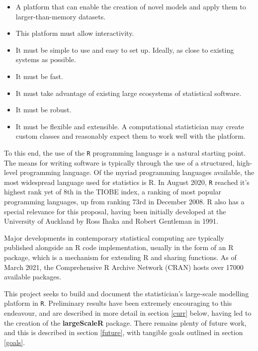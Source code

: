 \begin{itemize}
        \item A platform that can enable the creation of novel models and apply them to larger-than-memory datasets.
        \item This platform must allow interactivity.
        \item It must be simple to use and easy to set up.
                Ideally, as close to existing systems as possible.
        \item It must be fast.
        \item It must take advantage of existing large ecosystems of statistical software.
        \item It must be robust.
        \item It must be flexible and extensible.
                A computational statistician may create custom classes and reasonably expect them to work well with the platform.
\end{itemize}

To this end, the use of the \texttt{R} programming language is a natural starting point.
The means for writing software is typically through the use of a structured, high-level programming language.
Of the myriad programming languages available, the most widespread language used for statistics is R.
In August 2020, \texttt{R} reached it's highest rank yet of 8th in the TIOBE index, a ranking of most popular programming languages, up from ranking 73rd in December 2008\cite{tiobe2021r}.
R also has a special relevance for this proposal, having been initially developed at the University of Auckland by Ross Ihaka and Robert Gentleman in 1991\cite{ihaka1996r}.

Major developments in contemporary statistical computing are typically published alongside an R code implementation, usually in the form of an R package, which is a mechanism for extending R and sharing functions.
As of March 2021, the Comprehensive R Archive Network (CRAN) hosts over 17000 available packages\cite{team20:_r}.

This project seeks to build and document the statistician's large-scale modelling platform in \texttt{R}.
Preliminary results have been extremely encouraging to this endeavour, and are described in more detail in section \ref{curr} below, having led to the creation of the \textbf{largeScaleR} package\cite{cairns2020largescaler}.
There remains plenty of future work, and this is described in section \ref{future}, with tangible goals outlined in section \ref{goals}.

